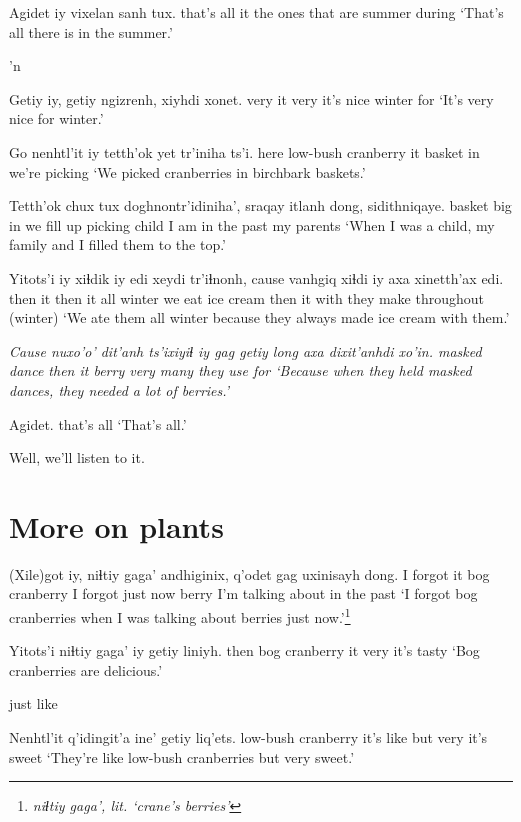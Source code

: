\documentclass[12pt]{article}
\begin{document}
\gll Agidet iy vixelan sanh tux.
{that's all} it {the ones that are} summer during
\glt `That's all there is in the summer.'
\glend

'n 

\gll Getiy iy, getiy ngizrenh, xiyhdi xonet. 
very it very {it's nice} winter for
\glt `It's very nice for winter.'
\glend

\gll Go nenhtl'it iy tetth'ok yet tr'iniha ts'i.
here {low-bush cranberry} it basket in {we're picking} 
\glt `We picked cranberries in birchbark baskets.'
\glend

\gll Tetth'ok chux tux doghnontr'idiniha', sraqay itlanh dong, sidithniqaye.
basket big in {we fill up picking} child {I am} {in the past} {my parents}
\glt `When I was a child, my family and I filled them to the top.'
\glend

\gll Yitots'i iy xiɬdik iy {edi xeydi} tr'iɬnonh, cause vanhgiq xiɬdi iy axa xinetth'ax edi.
then it then it {all winter} {we eat} {} {ice cream} then it with {they make} {throughout (winter)}
\glt `We ate them all winter because they always made ice cream with them.'
\glend

\gll \em{Cause} {nuxo'o' dit'anh} ts'ixiyiɬ iy gag getiy long {axa dixit'anhdi} xo'in.
{}    {masked dance} then it berry very many {they use} for
\glt `Because when they held masked dances, they needed a lot of berries.'
\glend

\gll Agidet.
{{that's all}}
\glt `That's all.'
\glend

Well, we'll listen to it.

\section{More on plants}

\gll (Xile)got iy, {niɬtiy gaga'} andhiginix, q'odet gag uxinisayh dong.
{I forgot} it {bog cranberry} {I forgot} {just now} berry {I'm talking about} {in the past}
\glt `I forgot bog cranberries when I was talking about berries just now.'\footnote{\em niɬtiy gaga', \em lit. `crane's berries'}
\glend

\gll Yitots'i {niɬtiy gaga'} iy getiy liniyh. 
then  {bog cranberry} it very {it's tasty}
\glt `Bog cranberries are delicious.'
\glend

just like 

\gll Nenhtl'it q'idingit'a ine' getiy liq'ets.
{low-bush cranberry} {it's like} but very {it's sweet}
\glt `They're like low-bush cranberries but very sweet.'
\glend
\end{document}
